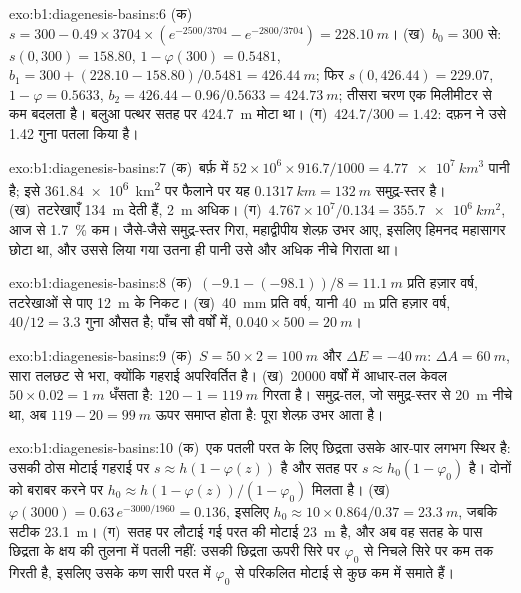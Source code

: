 \begin{solution}{exo:b1:diagenesis-basins:6}
(क)~$s = 300 - 0.49\times3704\times(e^{-2500/3704} - e^{-2800/3704}) =
\qty{228.10}{m}$। (ख)~$b_0 = 300$ से: $s(0, 300) = 158.80$, $1 - \varphi(300) =
0.5481$, $b_1 = 300 + (228.10 - 158.80)/0.5481 = \qty{426.44}{m}$; फिर
$s(0, 426.44) = 229.07$, $1 - \varphi = 0.5633$, $b_2 = 426.44 - 0.96/0.5633 =
\qty{424.73}{m}$; तीसरा चरण एक मिलीमीटर से कम बदलता है। बलुआ पत्थर सतह पर
\qty{424.7}{m} मोटा था। (ग)~$424.7/300 = 1.42$: दफ़न ने उसे \num{1.42} गुना पतला
किया है।
\end{solution}

\begin{solution}{exo:b1:diagenesis-basins:7}
(क)~बर्फ़ में $52\times10^6\times916.7/1000 = \qty{4.77e7}{km^3}$ पानी है; इसे
\qty{361.84e6}{km^2} पर फैलाने पर यह $\qty{0.1317}{km} = \qty{132}{m}$ समुद्र-स्तर है।
(ख)~तटरेखाएँ \qty{134}{m} देती हैं, \qty{2}{m} अधिक। (ग)~$4.767\times
10^7/0.134 = \qty{355.7e6}{km^2}$, आज से \qty{1.7}{\%} कम। जैसे-जैसे समुद्र-स्तर
गिरा, महाद्वीपीय शेल्फ़ उभर आए, इसलिए हिमनद महासागर छोटा था, और उससे लिया गया
उतना ही पानी उसे और अधिक नीचे गिराता था।
\end{solution}

\begin{solution}{exo:b1:diagenesis-basins:8}
(क)~$(-9.1 - (-98.1))/8 = \qty{11.1}{m}$ प्रति हज़ार वर्ष, तटरेखाओं से पाए
\qty{12}{m} के निकट। (ख)~\qty{40}{mm} प्रति वर्ष, यानी \qty{40}{m} प्रति हज़ार
वर्ष, $40/12 = 3.3$ गुना औसत है; पाँच सौ वर्षों में, $0.040\times500 = \qty{20}{m}$।
\end{solution}

\begin{solution}{exo:b1:diagenesis-basins:9}
(क)~$S = 50\times2 = \qty{100}{m}$ और $\Delta E = \qty{-40}{m}$: $\Delta A = \qty{60}{m}$,
सारा तलछट से भरा, क्योंकि गहराई अपरिवर्तित है। (ख)~\num{20000} वर्षों में
आधार-तल केवल $50\times0.02 = \qty{1}{m}$ धँसता है: 
$120 - 1 = \qty{119}{m}$ गिरता है। समुद्र-तल, जो समुद्र-स्तर से \qty{20}{m} नीचे था,
अब $119 - 20 = \qty{99}{m}$ ऊपर समाप्त होता है: पूरा शेल्फ़ उभर आता है।
\end{solution}

\begin{solution}{exo:b1:diagenesis-basins:10}
(क)~एक पतली परत के लिए छिद्रता उसके आर-पार लगभग स्थिर है: उसकी ठोस मोटाई
गहराई पर $s \approx h(1 - \varphi(z))$ है और सतह पर $s \approx h_0(1 -
\varphi_0)$ है। दोनों को बराबर करने पर $h_0 \approx h(1 -
\varphi(z))/(1 - \varphi_0)$ मिलता है। (ख)~$\varphi(3000) = 0.63\,e^{-3000/1960} =
0.136$, इसलिए $h_0 \approx 10\times0.864/0.37 = \qty{23.3}{m}$, जबकि सटीक
\qty{23.1}{m}। (ग)~सतह पर लौटाई गई परत की मोटाई \qty{23}{m} है, और अब वह सतह के
पास छिद्रता के क्षय की तुलना में पतली नहीं: उसकी छिद्रता ऊपरी सिरे पर
$\varphi_0$ से निचले सिरे पर कम तक गिरती है, इसलिए उसके कण सारी परत में
$\varphi_0$ से परिकलित मोटाई से कुछ कम में समाते हैं।
\end{solution}

